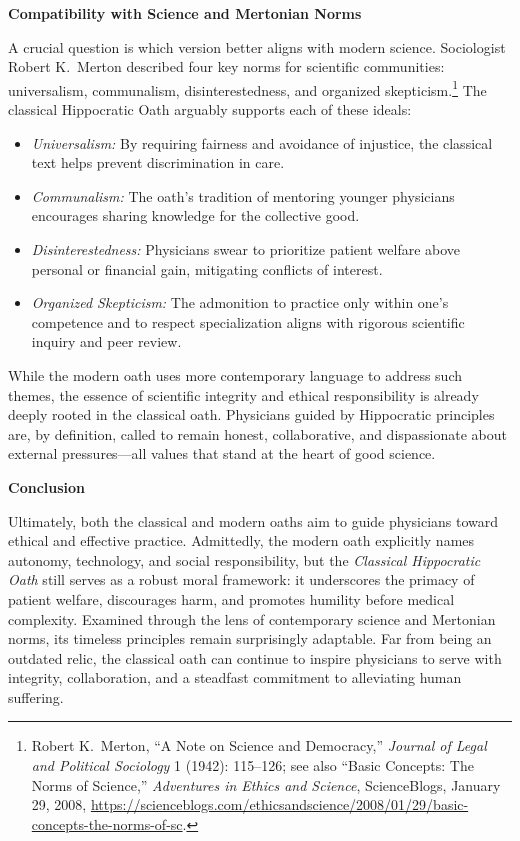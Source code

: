 \documentclass[12pt]{article}
\begin{document}
\bigskip
\textbf{Compatibility with Science and Mertonian Norms}

A crucial question is which version better aligns with modern science. 
Sociologist Robert K.\ Merton described four key norms for scientific communities: universalism, communalism, disinterestedness, 
and organized skepticism.\footnote{Robert K.\ Merton, ``A Note on Science and Democracy,'' 
\textit{Journal of Legal and Political Sociology} 1 (1942): 115--126; 
see also ``Basic Concepts: The Norms of Science,'' \textit{Adventures in Ethics and Science}, 
ScienceBlogs, January 29, 2008, \url{https://scienceblogs.com/ethicsandscience/2008/01/29/basic-concepts-the-norms-of-sc}.} 
The classical Hippocratic Oath arguably supports each of these ideals:

\begin{itemize}
    \item \textit{Universalism:} By requiring fairness and avoidance of injustice, the classical text helps prevent discrimination in care.
    \item \textit{Communalism:} The oath’s tradition of mentoring younger physicians encourages sharing knowledge for the collective good.
    \item \textit{Disinterestedness:} Physicians swear to prioritize patient welfare above personal or financial gain, mitigating conflicts of interest.
    \item \textit{Organized Skepticism:} The admonition to practice only within one’s competence and to respect specialization 
    aligns with rigorous scientific inquiry and peer review.
\end{itemize}

While the modern oath uses more contemporary language to address such themes, 
the essence of scientific integrity and ethical responsibility is already deeply rooted in the classical oath. 
Physicians guided by Hippocratic principles are, by definition, called to remain honest, collaborative, 
and dispassionate about external pressures—all values that stand at the heart of good science.

\bigskip
\textbf{Conclusion}

Ultimately, both the classical and modern oaths aim to guide physicians toward ethical and effective practice. 
Admittedly, the modern oath explicitly names autonomy, technology, and social responsibility, 
but the \textit{Classical Hippocratic Oath} still serves as a robust moral framework: 
it underscores the primacy of patient welfare, discourages harm, and promotes humility before medical complexity. 
Examined through the lens of contemporary science and Mertonian norms, its timeless principles remain surprisingly adaptable. 
Far from being an outdated relic, the classical oath can continue to inspire physicians to serve with integrity, 
collaboration, and a steadfast commitment to alleviating human suffering.
\end{document}
